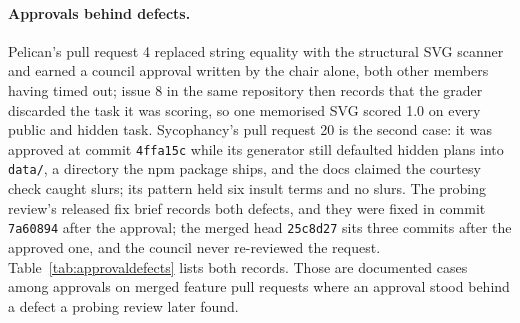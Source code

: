 \paragraph{Approvals behind defects.}
Pelican's pull request 4 replaced string equality with the structural SVG scanner and earned a council approval written by the chair alone, both other members having timed out; issue 8 in the same repository then records that the grader discarded the task it was scoring, so one memorised SVG scored 1.0 on every public and hidden task. Sycophancy's pull request 20 is the second case: it was approved at commit \texttt{4ffa15c} while its generator still defaulted hidden plans into \texttt{data/}, a directory the npm package ships, and the docs claimed the courtesy check caught slurs; its pattern held six insult terms and no slurs. The probing review's released fix brief records both defects, and they were fixed in commit \texttt{7a60894} after the approval; the merged head \texttt{25c8d27} sits three commits after the approved one, and the council never re-reviewed the request. Table~\ref{tab:approvaldefects} lists both records. Those are \approvalDefectCases{} documented cases among \councilMergedApproved{} approvals on \councilMergedFeature{} merged feature pull requests where an approval stood behind a defect a probing review later found.
